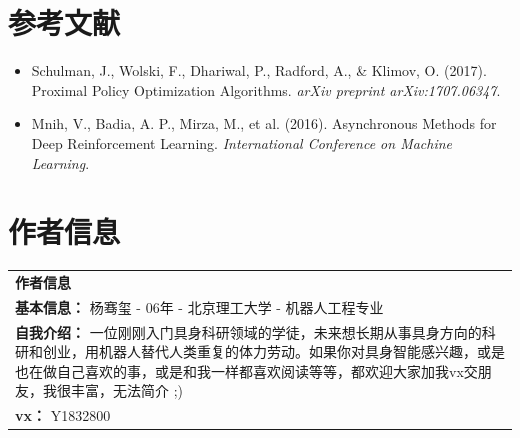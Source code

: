 \documentclass[12pt,a4paper]{article}
\theoremstyle{noteplain}
\theoremstyle{noteexercise}
\begin{document}
\section{参考文献}\label{sec:refs}

\begin{itemize}
  \setlength{\itemsep}{0.2em}
  \item Schulman, J., Wolski, F., Dhariwal, P., Radford, A., \& Klimov, O. (2017). Proximal Policy Optimization Algorithms. \textit{arXiv preprint arXiv:1707.06347}.
  \item Mnih, V., Badia, A. P., Mirza, M., et al. (2016). Asynchronous Methods for Deep Reinforcement Learning. \textit{International Conference on Machine Learning}.
\end{itemize}

\section{作者信息}\label{sec:author}

\begin{center}
  \begin{tabular}{p{15cm}}
    \hline
    \textbf{\large 作者信息} \\
    \textbf{基本信息：} 杨骞玺 - 06年 - 北京理工大学 - 机器人工程专业 \\
    \textbf{自我介绍：} 一位刚刚入门具身科研领域的学徒，未来想长期从事具身方向的科研和创业，用机器人替代人类重复的体力劳动。如果你对具身智能感兴趣，或是也在做自己喜欢的事，或是和我一样都喜欢阅读等等，都欢迎大家加我vx交朋友，我很丰富，无法简介 ;) \\
    \textbf{vx：} Y1832800 \\
    \hline
  \end{tabular}
\end{center}
\end{document}
